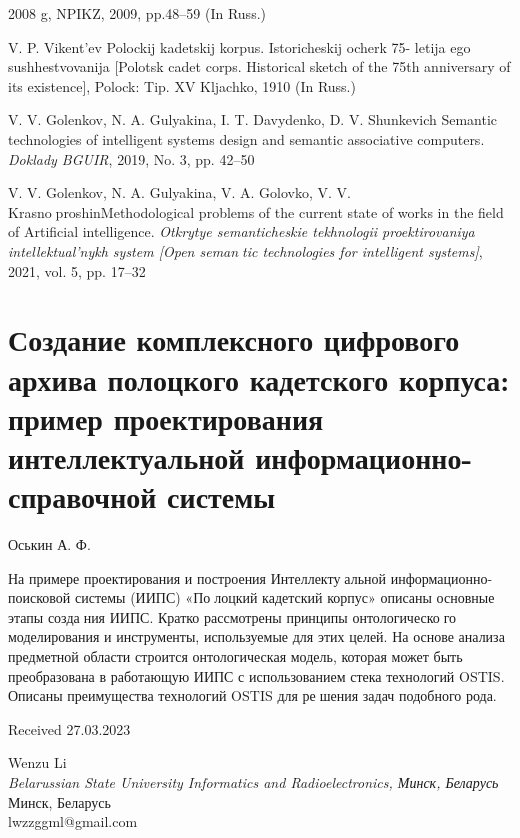 \documentclass{article}
\begin{document}
\begin{multicols}{2}
{\begin{enumerate}[label={[}\footnotesize\arabic*{]}, noitemsep, resume]
2008 g, NPIKZ, 2009, pp.48–59 (In Russ.)
\item V. P. Vikent’ev Polockij kadetskij korpus. Istoricheskij ocherk 75-
letija ego sushhestvovanija [Polotsk cadet corps. Historical sketch
of the 75th anniversary of its existence], Polock: Tip. XV Kljachko,
1910 (In Russ.)
\item V. V. Golenkov, N. A. Gulyakina, I. T. Davydenko, D. V.
Shunkevich Semantic technologies of intelligent systems design
and semantic associative computers. \textit{Doklady BGUIR}, 2019, No. 3,
pp. 42–50
\item V. V. Golenkov, N. A. Gulyakina, V. A. Golovko, V. V. KrasnoproshinMethodological problems of the current state of works
in the field of Artificial intelligence.\textit{ Otkrytye semanticheskie
tekhnologii proektirovaniya intellektual’nykh system [Open semantic technologies for intelligent systems]}, 2021, vol. 5, pp. 17–32
\end{enumerate}
}
\section{Создание комплексного цифрового\\
архива полоцкого кадетского корпуса:\\
пример проектирования\\
интеллектуальной
информационно-справочной системы}
\vspace{-0.5em}
\begin{center}
Оськин А. Ф.
\end{center}

{\small
\par На примере проектирования и построения Интеллектуальной информационно-поисковой системы (ИИПС) «Полоцкий кадетский корпус» описаны основные этапы создания ИИПС. Кратко рассмотрены принципы онтологического моделирования и инструменты, используемые для этих
целей. На основе анализа предметной области строится
онтологическая модель, которая может быть преобразована
в работающую ИИПС с использованием стека технологий
OSTIS. Описаны преимущества технологий OSTIS для решения задач подобного рода.
}
\begin{flushright}
Received 27.03.2023
\end{flushright}
\end{multicols}
\clearpage
\maketitle
\begin{center}
\vspace{-2,5cm}
\large Wenzu Li\\ \textit{Belarussian State University Informatics and Radioelectronics, Минск, Беларусь} \\
Минск, Беларусь\\
lwzzggml@gmail.com
\end{center}
\end{document}
